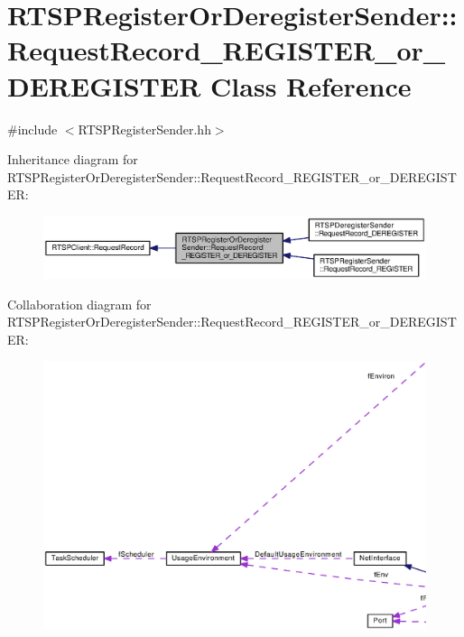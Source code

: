 \section{R\+T\+S\+P\+Register\+Or\+Deregister\+Sender\+:\+:Request\+Record\+\_\+\+R\+E\+G\+I\+S\+T\+E\+R\+\_\+or\+\_\+\+D\+E\+R\+E\+G\+I\+S\+T\+E\+R Class Reference}
\label{classRTSPRegisterOrDeregisterSender_1_1RequestRecord__REGISTER__or__DEREGISTER}


{\ttfamily \#include $<$R\+T\+S\+P\+Register\+Sender.\+hh$>$}



Inheritance diagram for R\+T\+S\+P\+Register\+Or\+Deregister\+Sender\+:\+:Request\+Record\+\_\+\+R\+E\+G\+I\+S\+T\+E\+R\+\_\+or\+\_\+\+D\+E\+R\+E\+G\+I\+S\+T\+E\+R\+:
\nopagebreak
\begin{figure}[H]
\begin{center}
\leavevmode
\includegraphics[width=350pt]{classRTSPRegisterOrDeregisterSender_1_1RequestRecord__REGISTER__or__DEREGISTER__inherit__graph}
\end{center}
\end{figure}


Collaboration diagram for R\+T\+S\+P\+Register\+Or\+Deregister\+Sender\+:\+:Request\+Record\+\_\+\+R\+E\+G\+I\+S\+T\+E\+R\+\_\+or\+\_\+\+D\+E\+R\+E\+G\+I\+S\+T\+E\+R\+:
\nopagebreak
\begin{figure}[H]
\begin{center}
\leavevmode
\includegraphics[width=350pt]{classRTSPRegisterOrDeregisterSender_1_1RequestRecord__REGISTER__or__DEREGISTER__coll__graph}
\end{center}
\end{figure}
